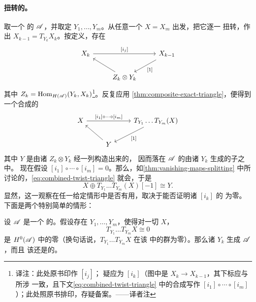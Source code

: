 \paragraph{扭转的\trComposition。}\label{sub:composition-of-twists}
取一个 \trCfinite{}的\trTriangulated{}\trACategory{} $\mathscr{A}$，并取定%
\trObject{} $Y_1,\ldots,Y_m$。从任意一个\trObject{} $X=X_m$ 出发，把它逐一
扭转，作出 $X_{k-1}=T_{Y_k}X_k$。按定义，存在\trExactTriangle
\begin{equation*}
\begin{tikzcd}
X_k \ar[rr,"{[i_j]}"] && X_{k-1} \ar[dl,"{[1]}"] \\
& Z_k\otimes Y_k \ar[ul] &
\end{tikzcd}
\end{equation*}
其中 $Z_k=\operatorname{Hom}_{H(\mathscr{A})}(Y_k,X_k)$\footnote{译注：此处原书印作 $[i_j]$；
疑应为 $[i_k]$（图中\trMorphism{}是 $X_k\to X_{k-1}$，其下标应与所涉%
\trObject{}一致，且下文\eqref{eq:combined-twist-triangle} 中的合成写作
$[i_1]\circ\cdots\circ[i_m]$）；此处照原书排印，存疑备案。——译者注}。反复应用
\cref{thm:composite-exact-triangle}，便得到一个合成的\trExactTriangle
\begin{equation}\label{eq:combined-twist-triangle}
\begin{tikzcd}
X \ar[rr,"{[i_1]\circ\cdots\circ[i_m]}"] && T_{Y_1}\ldots T_{Y_m}(X)
\ar[dl,"{[1]}"] \\
& Y \ar[ul] &
\end{tikzcd}
\end{equation}
其中\trObject{} $Y$ 是由诸 $Z_k\otimes Y_k$ 经一列\trExactTriangle{}构造出来的，
因而落在 $\mathscr{A}$ 的由诸 $Y_k$ 生成的\trTriangulated{}子\trCategory{}之中。
现在假设 $[i_1]\circ\cdots\circ[i_m]=0$。那么，如\cref{thm:vanishing-maps-splitting}
中所讨论的，\eqref{eq:combined-twist-triangle} 就会\trSplitting，于是
\begin{equation}\label{eq:combined-twist-split}
X\oplus T_{Y_1}\ldots T_{Y_m}(X)[-1]\cong Y.
\end{equation}
显然，这一观察在任一给定情形中是否有用，取决于能否证明诸 $[i_k]$ 的%
\trComposition{}为零。下面是两个特别简单的情形：

\begin{corollary}\label{thm:zero-twist-generates}
设 $\mathscr{A}$ 是一个 \trCfinite{}的\trTriangulated{}\trACategory。假设存在
$Y_1,\ldots,Y_m$，使得对一切\trObject{} $X$，
\begin{equation}\label{eq:iterated-twist-zero}
T_{Y_1}\ldots T_{Y_m}X\cong 0
\end{equation}
是 $H^0(\mathscr{A})$ 中的零\trObject{}（换句话说，$T_{Y_1}\ldots T_{Y_m}X$ 在该%
\trCategory{}中的\trEndomorphism{}群为零）。那么诸 $Y_k$ 生成 $\mathscr{A}$，而且
该\trCategory{}还是\trSplitClosed{}的。
\end{corollary}

